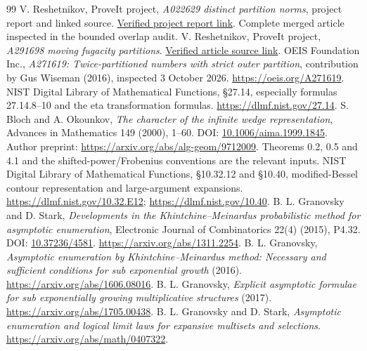 \documentclass[11pt]{article}
\theoremstyle{remark}\newtheorem{remark}[theorem]{Remark}
\begin{document}
\begin{thebibliography}{99}
 V. Reshetnikov, ProveIt project, \emph{A022629 distinct partition norms}, project report and linked source. \href{https://github.com/VladimirReshetnikov/ProveIt/blob/main/SetTheory/Cardinals/docs/reports/generating-functions-and-asymptotics/oeis-sequence-asymptotics/a022629-distinct-partition-norms/README.md}{Verified project report link}. Complete merged article inspected in the bounded overlap audit.
 V. Reshetnikov, ProveIt project, \emph{A291698 moving fugacity partitions}. \href{https://github.com/VladimirReshetnikov/ProveIt/blob/main/SetTheory/Cardinals/docs/reports/generating-functions-and-asymptotics/oeis-sequence-asymptotics/a291698-moving-fugacity-partitions/article.tex}{Verified article source link}.
 OEIS Foundation Inc., \emph{A271619: Twice-partitioned numbers with strict outer partition}, contribution by Gus Wiseman (2016), inspected 3 October 2026. \url{https://oeis.org/A271619}.
 NIST Digital Library of Mathematical Functions, \S27.14, especially formulas 27.14.8--10 and the eta transformation formulas. \url{https://dlmf.nist.gov/27.14}.
 S. Bloch and A. Okounkov, \emph{The character of the infinite wedge representation}, Advances in Mathematics 149 (2000), 1--60. DOI: \href{https://doi.org/10.1006/aima.1999.1845}{10.1006/aima.1999.1845}. Author preprint: \url{https://arxiv.org/abs/alg-geom/9712009}. Theorems 0.2, 0.5 and 4.1 and the shifted-power/Frobenius conventions are the relevant inputs.
 NIST Digital Library of Mathematical Functions, \S10.32.12 and \S10.40, modified-Bessel contour representation and large-argument expansions. \url{https://dlmf.nist.gov/10.32.E12}; \url{https://dlmf.nist.gov/10.40}.
 B. L. Granovsky and D. Stark, \emph{Developments in the Khintchine--Meinardus probabilistic method for asymptotic enumeration}, Electronic Journal of Combinatorics 22(4) (2015), P4.32. DOI: \href{https://doi.org/10.37236/4581}{10.37236/4581}. \url{https://arxiv.org/abs/1311.2254}.
 B. L. Granovsky, \emph{Asymptotic enumeration by Khintchine--Meinardus method: Necessary and sufficient conditions for sub exponential growth} (2016). \url{https://arxiv.org/abs/1606.08016}.
 B. L. Granovsky, \emph{Explicit asymptotic formulae for sub exponentially growing multiplicative structures} (2017). \url{https://arxiv.org/abs/1705.00438}.
 B. L. Granovsky and D. Stark, \emph{Asymptotic enumeration and logical limit laws for expansive multisets and selections}. \url{https://arxiv.org/abs/math/0407322}.

\end{thebibliography}
\end{document}
